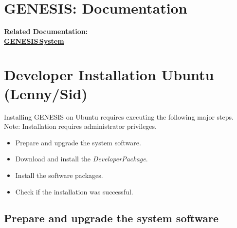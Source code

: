 \documentclass[12pt]{article}
\begin{document}
\section*{GENESIS: Documentation}

{\bf Related Documentation:} \\
\href{../genesis-system/genesis-system.tex}{\bf GENESIS\,System}

\section*{Developer Installation Ubuntu (Lenny/Sid)}

Installing GENESIS on Ubuntu requires executing the following major steps. Note: Installation requires administrator privileges.
\begin{itemize}
   \item[] Prepare and upgrade the system software.
   \item[] Download and install the {\it DeveloperPackage}.
   \item[] Install the software packages.
   \item[] Check if the installation was successful. 
\end{itemize}

\subsection*{Prepare and upgrade the system software}
\end{document}
